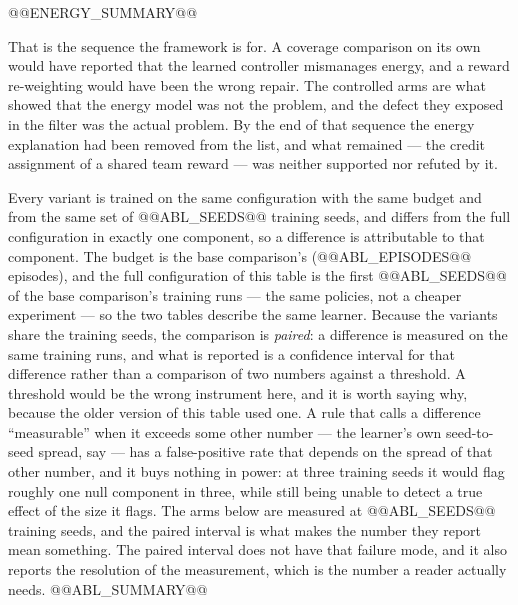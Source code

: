 @@ENERGY_SUMMARY@@

That is the sequence the framework is for.  A coverage comparison on its
own would have reported that the learned controller mismanages energy, and
a reward re-weighting would have been the wrong repair.  The controlled
arms are what showed that the energy model was not the problem, and the
defect they exposed in the filter was the actual problem.  By the end of
that sequence the energy explanation had been removed from the list, and
what remained --- the credit assignment of a shared team reward --- was
neither supported nor refuted by it.


Every variant is trained on the same configuration with the same budget and
from the same set of @@ABL_SEEDS@@ training seeds, and differs from the
full configuration in exactly one component, so a difference is
attributable to that component.  The budget is the base comparison's
(@@ABL_EPISODES@@ episodes), and the full configuration of this table is
the first @@ABL_SEEDS@@ of the base comparison's training runs --- the same
policies, not a cheaper experiment --- so the two tables describe the same
learner.  Because the variants share the training seeds, the
comparison is \emph{paired}: a difference is measured on the same training
runs, and what is reported is a confidence interval for that difference
rather than a comparison of two numbers against a threshold.  A threshold
would be the wrong instrument here, and it is worth saying why, because
the older version of this table used one.  A rule that calls a difference
``measurable'' when it exceeds some other number --- the learner's own
seed-to-seed spread, say --- has a false-positive rate that depends on
the spread of that other number, and it buys nothing in power: at three
training seeds it would flag roughly one null component in three, while
still being unable to detect a true effect of the size it flags.  The
arms below are measured at @@ABL_SEEDS@@ training seeds, and the paired
interval is what makes the number they report mean something.  The
paired interval does not have that failure mode, and it also reports the
resolution of the measurement, which is the number a reader actually
needs.  @@ABL_SUMMARY@@

